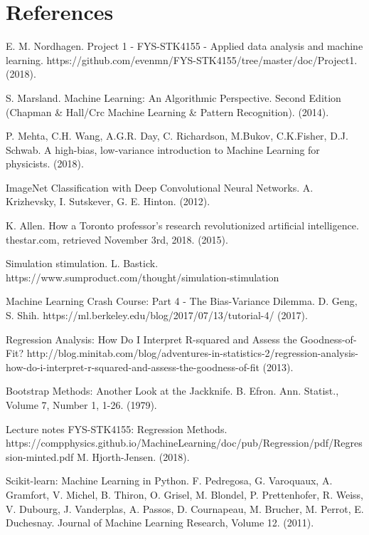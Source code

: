 \newpage
\section{References}

\begingroup
\renewcommand{\section}[2]{}
\begin{thebibliography}{}
	E. M. Nordhagen.
	Project 1 - FYS-STK4155 - Applied data analysis and machine learning.
	https://github.com/evenmn/FYS-STK4155/tree/master/doc/Project1.
	(2018).
	
	S. Marsland.
	Machine Learning: An Algorithmic Perspective. Second Edition (Chapman \& Hall/Crc Machine Learning \& Pattern Recognition).
	(2014).
	
	P. Mehta, C.H. Wang, A.G.R. Day, C. Richardson, M.Bukov, C.K.Fisher, D.J. Schwab.
	A high-bias, low-variance introduction to Machine Learning for physicists.
	(2018).
	
	ImageNet Classification with Deep Convolutional Neural Networks.
	A. Krizhevsky, I. Sutskever, G. E. Hinton.
	(2012).
	
	K. Allen.
	How a Toronto professor’s research revolutionized artificial intelligence.
	thestar.com, retrieved November 3rd, 2018.
	(2015).
	
	Simulation stimulation.
	L. Bastick.
	https://www.sumproduct.com/thought/simulation-stimulation
	
	Machine Learning Crash Course: Part 4 - The Bias-Variance Dilemma.
	D. Geng, S. Shih.
	https://ml.berkeley.edu/blog/2017/07/13/tutorial-4/
	(2017).
	
	Regression Analysis: How Do I Interpret R-squared and Assess the Goodness-of-Fit?
	http://blog.minitab.com/blog/adventures-in-statistics-2/regression-analysis-how-do-i-interpret-r-squared-and-assess-the-goodness-of-fit
	(2013).
	
	Bootstrap Methods: Another Look at the Jackknife.
	B. Efron. 
	Ann. Statist., Volume 7, Number 1, 1-26.
	(1979).
	
	Lecture notes FYS-STK4155: Regression Methods.
	https://compphysics.github.io/MachineLearning/doc/pub/Regression/pdf/Regression-minted.pdf
	M. Hjorth-Jensen.
	(2018).
	
	Scikit-learn: Machine Learning in Python.
	F. Pedregosa, G. Varoquaux, A. Gramfort, V. Michel, B. Thiron, O. Grisel, M. Blondel, P. Prettenhofer, R. Weiss, V. Dubourg, J. Vanderplas, A. Passos, D. Cournapeau, M. Brucher, M. Perrot, E. Duchesnay.
    Journal of Machine Learning Research, Volume 12.
	(2011).
	
\end{thebibliography}
\endgroup